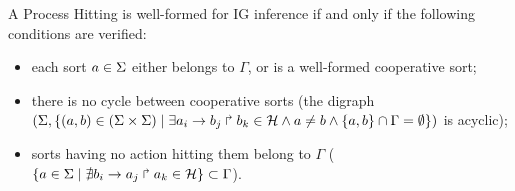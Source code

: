 \begin{property}\label{pro:wf-ph}
A Process Hitting is well-formed for IG inference if and only if the following conditions are
verified:
\begin{itemize}
\item 
each sort $a\in\Sigma$ either belongs to $\Gamma$, or is a well-formed cooperative sort;
\item 
there is no cycle between cooperative sorts
(the digraph $(\Sigma,\{(a,b)\in(\Sigma\times\Sigma)\mid \exists a_i\rightarrow b_j\Rsh b_k\in\mathcal{H}
\wedge a\neq b\wedge \{a,b\}\cap\Gamma=\emptyset \})$ is
acyclic);
\item 
sorts having no action hitting them belong to $\Gamma$
($\{ a \in \Sigma\mid \nexists b_i\rightarrow a_j\Rsh a_k\in\mathcal{H}\} \subset \Gamma$).
\end{itemize}
\end{property}

\begin{comment}
\begin{center}
\begin{tikzpicture}
\TSetSortLabel{a}{b}
\TSetSortLabel{b}{c}
\TSetSortLabel{z}{a}
\TSetSortLabel{ab}{bc}
\TSort{(0,3)}{a}{2}{l}
\TSort{(0,0)}{b}{2}{l}
\TSetTick{ab}{0}{00}
\TSetTick{ab}{1}{01}
\TSetTick{ab}{2}{10}
\TSetTick{ab}{3}{11}
\TSort{(3,0.5)}{ab}{4}{r}
\TSort{(6,1)}{z}{3}{r}

\THit{a_1}{}{ab_0}{.west}{ab_2}
\THit{a_1}{}{ab_1}{.west}{ab_3}
\path[bounce,bend left] \TBounce{ab_0}{}{ab_2}{.south} \TBounce{ab_1}{}{ab_3}{.south};

\THit{a_0}{}{ab_2}{.west}{ab_0}
\THit{a_0}{}{ab_3}{.west}{ab_1}
\path[bounce,bend right] \TBounce{ab_2}{}{ab_0}{.north} \TBounce{ab_3}{}{ab_1}{.north};

\THit{b_0}{}{ab_3}{.west}{ab_2}
\THit{b_0}{}{ab_1}{.west}{ab_0}
\THit{b_1}{}{ab_0}{.west}{ab_1}
\THit{b_1}{}{ab_2}{.west}{ab_3}
\path[bounce,bend right] \TBounce{ab_1}{}{ab_0}{.north} \TBounce{ab_3}{}{ab_2}{.north};
\path[bounce,bend left] \TBounce{ab_0}{}{ab_1}{.south} \TBounce{ab_2}{}{ab_3}{.south};

\THit{ab_2}{}{z_1}{.north west}{z_2}
\THit{ab_2}{}{z_0}{.north west}{z_1}
\path[bounce,bend left] \TBounce{z_1}{}{z_2}{.south} \TBounce{z_0}{}{z_1}{.south};
\THit{ab_3}{}{z_2}{.south west}{z_1}
\THit{ab_3}{}{z_0}{.north west}{z_1}
\path[bounce,bend left] \TBounce{z_2}{bend right}{z_1}{.north} \TBounce{z_0}{}{z_1}{.south};
\THit{ab_1}{}{z_2}{.south west}{z_1}
\THit{ab_1}{}{z_1}{.south west}{z_0}
\path[bounce,bend right] \TBounce{z_2}{}{z_1}{.north} \TBounce{z_1}{}{z_0}{.north};
\THit{ab_0}{}{z_2}{.south west}{z_1}
\THit{ab_0}{}{z_1}{.south west}{z_0}
\path[bounce,bend right] \TBounce{z_2}{}{z_1}{.north} \TBounce{z_1}{}{z_0}{.north};
\end{tikzpicture}
\end{center}
\end{comment}

